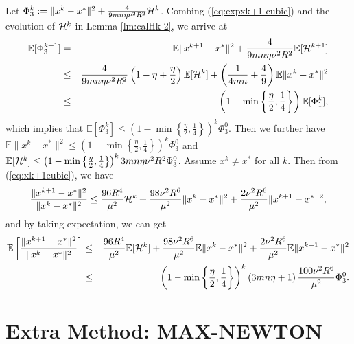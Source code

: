 \documentclass[12pt]{article}
\newcommand{\eqdef}{\; { := }\;}
\begin{document}
Let $\Phi_3^k \eqdef \|x^{k} - x^*\|^2 + \frac{4}{9mn\eta  \nu^2 R^2} {\cal H}^{k}$. Combing (\ref{eq:expxk+1-cubic}) and the evolution of ${\cal H}^k$ in Lemma \ref{lm:calHk-2}, we arrive at 
\begin{eqnarray*}
	\mathbb{E}[\Phi_3^{k+1}] &=& \mathbb{E}\|x^{k+1} - x^*\|^2 + \frac{4}{9mn\eta  \nu^2 R^2}  \mathbb{E}[{\cal H}^{k+1}] \\ 
	&\leq&  \frac{4}{9mn \eta \nu^2 R^2} \left(  1 - \eta + \frac{\eta}{2}  \right) \mathbb{E}[{\cal H}^k] + \left(  \frac{1}{4mn} + \frac{4}{9}  \right) \mathbb{E}\|x^k - x^*\|^2 \\ 
	&\leq& \left(  1 - \min \left\{  \frac{\eta}{2}, \frac{1}{4}  \right\}  \right) \mathbb{E}[\Phi_1^k], 
\end{eqnarray*}
which implies that $\mathbb{E}[\Phi_3^k] \leq  \left(  1 - \min \left\{  \frac{\eta}{2}, \frac{1}{4}  \right\}  \right)^k \Phi_3^0$. Then we further have $\mathbb{E}\|x^k - x^*\|^2 \leq  \left(  1 - \min \left\{  \frac{\eta}{2}, \frac{1}{4}  \right\}  \right)^k \Phi_3^0$ and $\mathbb{E}[{\cal H}^k] \leq  \left(  1 - \min \left\{  \frac{\eta}{2}, \frac{1}{4}  \right\}  \right)^k 3mn\eta \nu^2 R^2 \Phi_3^0$. Assume $x^k \neq x^*$ for all $k$. Then from (\ref{eq:xk+1cubic}), we have 
$$
\frac{\|x^{k+1} - x^*\|^2}{\|x^k - x^*\|^2 } \leq \frac{96R^4}{ \mu^2} {\cal H}^k + \frac{98 \nu^2 R^6}{\mu^2}\|x^k - x^*\|^2 + \frac{2\nu^2 R^6}{\mu^2} \|x^{k+1} - x^*\|^2, 
$$
and by taking expectation, we can get 
\begin{eqnarray*}
	\mathbb{E} \left[  \frac{\|x^{k+1} - x^*\|^2}{\|x^k - x^*\|^2 }  \right] &\leq& \frac{96R^4}{ \mu^2} \mathbb{E} [{\cal H}^k] + \frac{98 \nu^2 R^6}{\mu^2} \mathbb{E}\|x^k - x^*\|^2 + \frac{2\nu^2 R^6}{\mu^2}\mathbb{E} \|x^{k+1} - x^*\|^2 \\ 
	&\leq& \left(  1 - \min \left\{  \frac{\eta}{2}, \frac{1}{4}  \right\}  \right)^k  \left(  {3mn\eta} + 1  \right) \frac{100\nu^2 R^6}{\mu^2} \Phi_3^0. 
\end{eqnarray*}


\clearpage
\section{Extra Method: {\sf MAX-NEWTON}} \label{sec:maxNewton}


\end{document}
